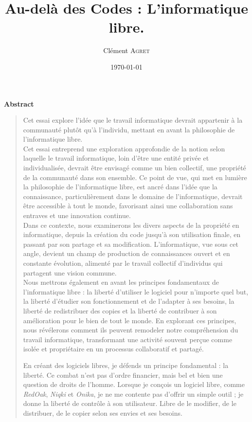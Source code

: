\documentclass[10pt]{book}
\title{Au-delà des Codes  : L'informatique libre.}
\author{Clément \textsc{Agret}}
\date{\today}
\def\redoak{\mbox{\textsl{RedOak}}\xspace}
\def\niqki{\mbox{\textsl{Niqki}}\xspace}
\def\onika{\mbox{\textsl{Onika}}\xspace}
\begin{document}
\maketitle
\begin{center}
\large \textbf{Abstract}
\end{center}

\begin{quotation}
Cet essai explore l'idée que le travail informatique devrait appartenir à la communauté plutôt qu'à l'individu, mettant en avant la philosophie de l'informatique libre.\\
Cet essai entreprend une exploration approfondie de la notion selon laquelle le travail informatique, loin d'être une entité privée et individualisée, devrait être envisagé comme un bien collectif, une propriété de la communauté dans son ensemble. Ce point de vue, qui met en lumière la philosophie de l'informatique libre, est ancré dans l'idée que la connaissance, particulièrement dans le domaine de l'informatique, devrait être accessible à tout le monde, favorisant ainsi une collaboration sans entraves et une innovation continue.\\

Dans ce contexte, nous examinerons les divers aspects de la propriété en informatique, depuis la création du code jusqu'à son utilisation finale, en passant par son partage et sa modification. L'informatique, vue sous cet angle, devient un champ de production de connaissances ouvert et en constante évolution, alimenté par le travail collectif d'individus qui partagent une vision commune.\\

Nous mettrons également en avant les principes fondamentaux de l'informatique libre : la liberté d'utiliser le logiciel pour n'importe quel but, la liberté d'étudier son fonctionnement et de l'adapter à ses besoins, la liberté de redistribuer des copies et la liberté de contribuer à son amélioration pour le bien de tout le monde. En explorant ces principes, nous révélerons comment ils peuvent remodeler notre compréhension du travail informatique, transformant une activité souvent perçue comme isolée et propriétaire en un processus collaboratif et partagé.

En créant des logiciels libres, je défends un principe fondamental : la liberté. Ce combat n'est pas d'ordre financier, mais bel et bien une question de droits de l'homme. Lorsque je conçois un logiciel libre, comme \redoak, \niqki et \onika, je ne me contente pas d'offrir un simple outil ; je donne la liberté de contrôle à son utilisateur. Libre de le modifier, de le distribuer, de le copier selon ses envies et ses besoins.


\end{quotation}
\end{document}
